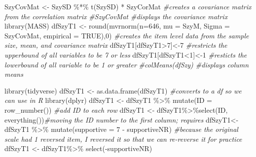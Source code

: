 \documentclass[
  english,
]{book}
\newenvironment{Shaded}{\begin{snugshade}}{\end{snugshade}}
\newcommand{\AttributeTok}[1]{\textcolor[rgb]{0.77,0.63,0.00}{#1}}
\newcommand{\CommentTok}[1]{\textcolor[rgb]{0.56,0.35,0.01}{\textit{#1}}}
\newcommand{\ConstantTok}[1]{\textcolor[rgb]{0.00,0.00,0.00}{#1}}
\newcommand{\DecValTok}[1]{\textcolor[rgb]{0.00,0.00,0.81}{#1}}
\newcommand{\FunctionTok}[1]{\textcolor[rgb]{0.00,0.00,0.00}{#1}}
\newcommand{\NormalTok}[1]{#1}
\newcommand{\OtherTok}[1]{\textcolor[rgb]{0.56,0.35,0.01}{#1}}
\newcommand{\SpecialCharTok}[1]{\textcolor[rgb]{0.00,0.00,0.00}{#1}}
\begin{document}
\begin{Shaded}
\begin{Highlighting}[]
\NormalTok{SzyCovMat }\OtherTok{\textless{}{-}}\NormalTok{ SzySD }\SpecialCharTok{\%*\%} \FunctionTok{t}\NormalTok{(SzySD) }\SpecialCharTok{*}\NormalTok{ SzyCorMat }\CommentTok{\#creates a covariance matrix from the correlation matrix}
\CommentTok{\#SzyCovMat \#displays the covariance matrix}
\FunctionTok{library}\NormalTok{(MASS)}
\NormalTok{dfSzyT1 }\OtherTok{\textless{}{-}} \FunctionTok{round}\NormalTok{(}\FunctionTok{mvrnorm}\NormalTok{(}\AttributeTok{n=}\DecValTok{646}\NormalTok{, }\AttributeTok{mu =}\NormalTok{ SzyM, }\AttributeTok{Sigma =}\NormalTok{ SzyCovMat, }\AttributeTok{empirical =} \ConstantTok{TRUE}\NormalTok{),}\DecValTok{0}\NormalTok{) }\CommentTok{\#creates the item level data from the sample size, mean, and covariance matrix}
\NormalTok{dfSzyT1[dfSzyT1}\SpecialCharTok{\textgreater{}}\DecValTok{7}\NormalTok{]}\OtherTok{\textless{}{-}}\DecValTok{7} \CommentTok{\#restricts the upperbound of all variables to be 7 or less}
\NormalTok{dfSzyT1[dfSzyT1}\SpecialCharTok{\textless{}}\DecValTok{1}\NormalTok{]}\OtherTok{\textless{}{-}}\DecValTok{1} \CommentTok{\#resticts the lowerbound of all variable to be 1 or greater}
\CommentTok{\#colMeans(dfSzy) \#displays column means}

\FunctionTok{library}\NormalTok{(tidyverse)}
\NormalTok{dfSzyT1 }\OtherTok{\textless{}{-}} \FunctionTok{as.data.frame}\NormalTok{(dfSzyT1) }\CommentTok{\#converts to a df so we can use in R}
\FunctionTok{library}\NormalTok{(dplyr)}
\NormalTok{dfSzyT1 }\OtherTok{\textless{}{-}}\NormalTok{ dfSzyT1 }\SpecialCharTok{\%\textgreater{}\%} \FunctionTok{mutate}\NormalTok{(}\AttributeTok{ID =} \FunctionTok{row\_number}\NormalTok{()) }\CommentTok{\#add ID to each row}
\NormalTok{dfSzyT1 }\OtherTok{\textless{}{-}}\NormalTok{ dfSzyT1}\SpecialCharTok{\%\textgreater{}\%}\FunctionTok{select}\NormalTok{(ID, }\FunctionTok{everything}\NormalTok{())}\CommentTok{\#moving the ID number to the first column; requires}
\NormalTok{dfSzyT1}\OtherTok{\textless{}{-}}\NormalTok{ dfSzyT1 }\SpecialCharTok{\%\textgreater{}\%}
  \FunctionTok{mutate}\NormalTok{(}\AttributeTok{supportive =} \DecValTok{7} \SpecialCharTok{{-}}\NormalTok{ supportiveNR) }\CommentTok{\#because the original scale had 1 reversed item, I reversed it so that we can re{-}reverse it for practice}
\NormalTok{dfSzyT1 }\OtherTok{\textless{}{-}}\NormalTok{ dfSzyT1}\SpecialCharTok{\%\textgreater{}\%}
  \FunctionTok{select}\NormalTok{(}\SpecialCharTok{{-}}\NormalTok{supportiveNR)}
\end{Highlighting}
\end{Shaded}
\end{document}
